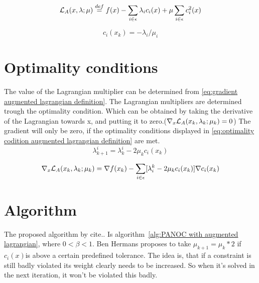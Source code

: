 	\begin{equation}
		\mathcal{L}_A(x,\lambda;\mu) \overset{def}{=} f(x) - \sum_{i \in \epsilon}\lambda_ic_i(x) + \mu \sum_{i \in \epsilon}c_i^2(x)
		\label{eq:augmented lagrangian definition}
	\end{equation}
			
	\begin{equation}
		c_i(x_k) = -\lambda_i/\mu_i
		\label{eq:perturbed feasibility conditions}
	\end{equation}
	

\section{Optimality conditions}
	The value of the Lagrangian multiplier can be determined from \eqref{eq:gradient augmented lagrangian definition}. The Lagrangian multipliers are determined trough the optimality condition. Which can be obtained by taking the derivative of the Lagrangian towards x, and putting it to zero.($\nabla_x \mathcal{L}_A(x_k,\lambda_k;\mu_k) = 0$) The gradient will only be zero, if the optimality conditions displayed in \eqref{eq:optimality codition augmented lagrangian definition} are met.
	\begin{equation}
		\lambda_{k+1}^{i} = \lambda_{k}^{i} - 2\mu_k c_i(x_k)
		\label{eq:optimality codition augmented lagrangian definition}
	\end{equation}

	\begin{equation}
		\nabla_x \mathcal{L}_A(x_k,\lambda_k;\mu_k) = \nabla f(x_k) - \sum_{i \in \epsilon} [\lambda_i^k - 2\mu_k c_i(x_k)] \nabla c_i(x_k)
		\label{eq:gradient augmented lagrangian definition}
	\end{equation}	
	
	
	
\section{Algorithm}
	The proposed algorithm by cite.. Is algorithm~\ref{alg:PANOC with augmented lagrangian}, where $0<\beta<1$. Ben Hermans proposes to take $\mu_{k+1}=\mu_k*2$ if $c_i(x)$is above a certain predefined tolerance. The idea is, that if a constraint is still badly violated its weight clearly needs to be increased. So when it's solved in the next iteration, it won't be violated this badly.
	
